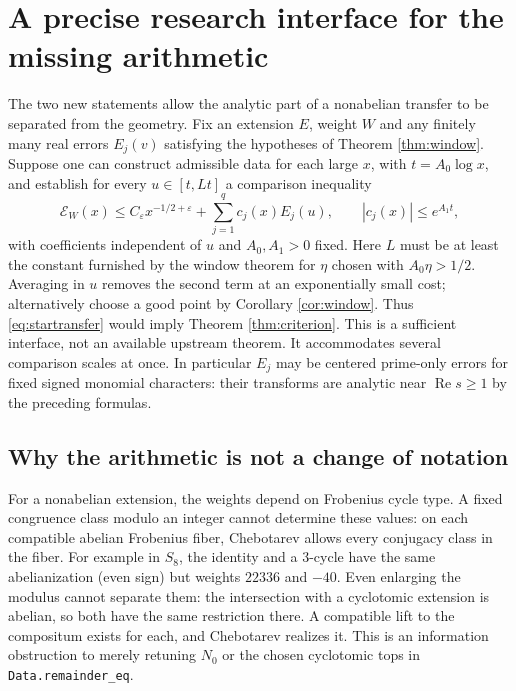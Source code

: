 \documentclass[11pt]{article}
\theoremstyle{remark}\newtheorem{remark}[theorem]{Remark}
\DeclareMathOperator{\Ree}{Re}
\newcommand{\eps}{\varepsilon}
\begin{document}
\section{A precise research interface for the missing arithmetic}
The two new statements allow the analytic part of a nonabelian
transfer to be separated from the geometry. Fix an extension $E$,
weight $W$ and any finitely many real errors $E_j(v)$ satisfying the
hypotheses of Theorem \ref{thm:window}. Suppose one can construct
admissible data for each large $x$, with $t=A_0\log x$, and establish
for every $u\in[t,Lt]$ a comparison inequality
\begin{equation}\label{eq:startransfer}
 \mathcal E_W(x)\le C_\eps x^{-1/2+\eps}
       +\sum_{j=1}^q c_j(x) E_j(u),
 \qquad |c_j(x)|\le e^{A_1t},
\end{equation}
with coefficients independent of $u$ and $A_0,A_1>0$ fixed. Here $L$
must be at least the constant furnished by the window theorem for
$\eta$ chosen with $A_0\eta>1/2$. Averaging in $u$ removes the second
term at an exponentially small cost; alternatively choose a good
point by Corollary \ref{cor:window}. Thus \eqref{eq:startransfer}
would imply Theorem \ref{thm:criterion}. This is a sufficient
interface, not an available upstream theorem. It accommodates several
comparison scales at once. In particular $E_j$ may be centered
prime-only errors for fixed signed monomial characters: their
transforms are analytic near $\Ree s\ge1$ by the preceding formulas.

\subsection{Why the arithmetic is not a change of notation}
For a nonabelian extension, the weights depend on Frobenius cycle
type. A fixed congruence class modulo an integer cannot determine
these values: on each compatible abelian Frobenius fiber, Chebotarev
allows every conjugacy class in the fiber. For example in $S_8$, the
identity and a 3-cycle have the same abelianization (even sign) but
weights $22336$ and $-40$. Even enlarging the modulus cannot separate
them: the intersection with a cyclotomic extension is abelian, so
both have the same restriction there. A compatible lift to the
compositum exists for each, and Chebotarev realizes it. This is an
information obstruction to merely retuning $N_0$ or the chosen
cyclotomic tops in \texttt{Data.remainder\_eq}.
\end{document}
